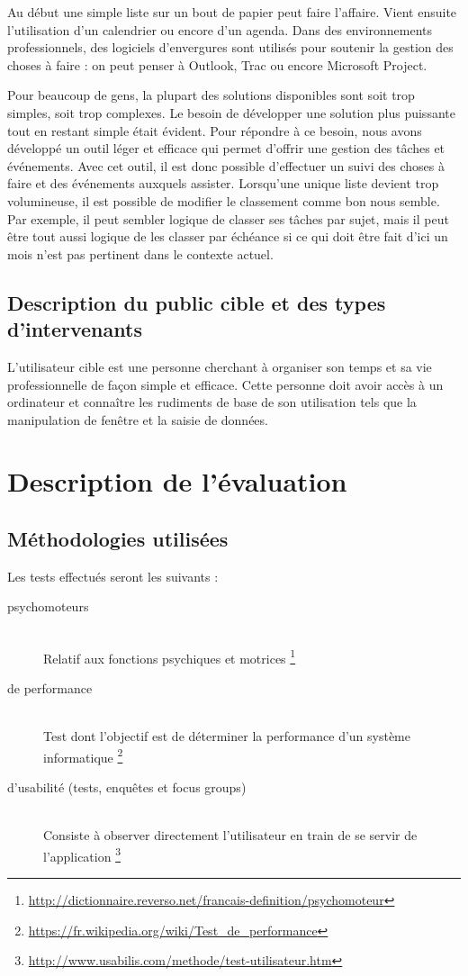 \documentclass[letterpaper, oneside, 12pt,these,creativecommons]{thETS}
\begin{document}
Au début une simple liste sur un bout de papier peut faire l'affaire. Vient ensuite l'utilisation d'un calendrier ou encore d'un agenda. Dans des environnements professionnels, des logiciels d'envergures sont utilisés pour soutenir la gestion des choses à faire : on peut penser à Outlook, Trac ou encore Microsoft Project.

Pour beaucoup de gens, la plupart des solutions disponibles sont soit trop simples, soit trop complexes. Le besoin de développer une solution plus puissante tout en restant simple était évident. Pour répondre à ce besoin, nous avons développé un outil léger et efficace qui permet d'offrir une gestion des tâches et événements. Avec cet outil, il est donc possible d'effectuer un suivi des choses à faire et des événements auxquels assister. Lorsqu'une unique liste devient trop volumineuse, il est possible de modifier le classement comme bon nous semble. Par exemple, il peut sembler logique de classer ses tâches par sujet, mais il peut être tout aussi logique de les classer par échéance si ce qui doit être fait d'ici un mois n'est pas pertinent dans le contexte actuel.

\section{Description du public cible et des types d’intervenants}

L'utilisateur cible est une personne cherchant à organiser son temps et sa vie professionnelle de façon simple et efficace. Cette personne doit avoir accès à un ordinateur et connaître les rudiments de base de son utilisation tels que la manipulation de fenêtre et la saisie de données.

\chapter{Description de l'évaluation}

\section{Méthodologies utilisées}

Les tests effectués seront les suivants :
\begin{description}
\item [psychomoteurs] \hfill \\ Relatif aux fonctions psychiques et motrices \footnote{\url{http://dictionnaire.reverso.net/francais-definition/psychomoteur}}
\item [de performance] \hfill \\ Test dont l'objectif est de déterminer la performance d'un système informatique \footnote{\url{https://fr.wikipedia.org/wiki/Test_de_performance}}
\item [d’usabilité (tests, enquêtes et focus groups)] \hfill \\ Consiste à observer directement l'utilisateur en train de se servir de l'application \footnote{\url{http://www.usabilis.com/methode/test-utilisateur.htm}}
\end{description}
\end{document}
